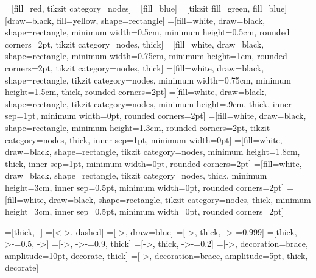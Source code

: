 


=[fill=red, tikzit category=nodes]
=[fill=blue]
=[tikzit fill=green, fill=blue]
=[draw=black, fill=yellow, shape=rectangle]
=[fill=white, draw=black, shape=rectangle, minimum width=0.5cm, minimum height=0.5cm, rounded corners=2pt, tikzit category=nodes, thick]
=[fill=white, draw=black, shape=rectangle, minimum width=0.75cm, minimum height=1cm, rounded corners=2pt, tikzit category=nodes, thick]
=[fill=white, draw=black, shape=rectangle, tikzit category=nodes, minimum width=0.75cm, minimum height=1.5cm, thick, rounded corners=2pt]
=[fill=white, draw=black, shape=rectangle, tikzit category=nodes, minimum height=.9cm, thick, inner sep=1pt, minimum width=0pt, rounded corners=2pt]
=[fill=white, draw=black, shape=rectangle, minimum height=1.3cm, rounded corners=2pt, tikzit category=nodes, thick, inner sep=1pt, minimum width=0pt]
=[fill=white, draw=black, shape=rectangle, tikzit category=nodes, minimum height=1.8cm, thick, inner sep=1pt, minimum width=0pt, rounded corners=2pt]
=[fill=white, draw=black, shape=rectangle, tikzit category=nodes, thick, minimum height=3cm, inner sep=0.5pt, minimum width=0pt, rounded corners=2pt]
=[fill=white, draw=black, shape=rectangle, tikzit category=nodes, thick, minimum height=3cm, inner sep=0.5pt, minimum width=0pt, rounded corners=2pt]

=[thick, -]
=[<->, dashed]
=[->, draw=blue]
=[->, thick, ->-=0.999]
=[thick, ->-=0.5, ->]
=[->, ->-=0.9, thick]
=[->, thick, ->-=0.2]
=[->, decoration={brace, amplitude=10pt}, decorate, thick]
=[->, decoration={brace, amplitude=5pt}, thick, decorate]
